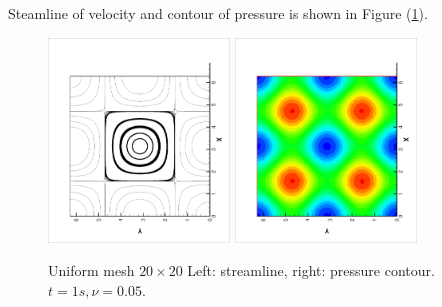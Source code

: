 \documentclass{article}
\begin{document}
 Steamline of velocity and contour of pressure is shown in Figure (\ref{fig::uniform20_solution}).
 \begin{figure}[ht]
   \centering
   \includegraphics[width = 0.43\textwidth, angle = -90]{./uniform20_streamline.eps}
   \includegraphics[width = 0.43\textwidth, angle = -90]{./uniform20_pressure.eps}
   \caption{\small Uniform mesh $20 \times 20$
     Left: streamline, right: pressure
     contour. $t = 1s, \nu = 0.05$.}
   \label{fig::uniform20_solution}
 \end{figure}
\end{document}

